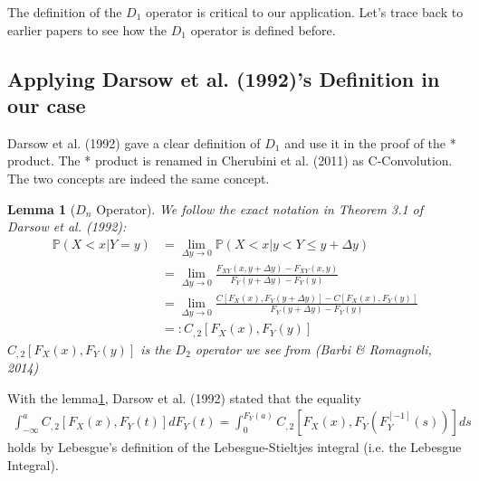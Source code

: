 \documentclass[11pt, leqno]{article}
\newtheorem{lemma}{Lemma}[section]
\numberwithin{equation}{section}
\begin{document}
    The definition of the $D_1$ operator is critical to our application.
Let's trace back to earlier papers to see how the $D_1$ operator is defined before.\newline

\subsection{Applying Darsow et al. (1992)'s Definition in our case}\label{sec:Darsow}

Darsow et al. (1992) gave a clear definition of $D_1$ and use it in the proof of the * product.
The * product is renamed in Cherubini et al. (2011) as C-Convolution.
The two concepts are indeed the same concept.
\begin{lemma}[$D_n$ Operator]\label{lem:Dn} We follow the exact notation in Theorem 3.1 of Darsow et al. (1992):
    \begin{align}
        \mathbb{P}(X<x|Y=y) &= \lim_{\Delta y \rightarrow 0} \mathbb{P}(X<x|y<Y\leq y+ \Delta y)\\
        &= \lim_{\Delta y \rightarrow 0} \frac{F_{XY}(x,y+\Delta y) - F_{XY}(x,y)}{F_Y(y+\Delta y)-F_Y(y)}\\
        &= \lim_{\Delta y \rightarrow 0} \frac{C[F_X(x), F_Y(y+\Delta y)] - C[F_X(x), F_Y(y)]}{F_Y(y+\Delta y)-F_Y(y)}  \label{eq:limD2}\\
        &=: C_{,2}[F_X(x), F_Y(y)]
    \end{align}
$C_{,2}[F_X(x), F_Y(y)]$ is the $D_2$ operator we see from (Barbi \& Romagnoli, 2014)\newline
\end{lemma}

    With the lemma\ref{lem:Dn}, Darsow et al. (1992) stated that the equality
\begin{align} \label{eq:leb}
    \int^a_{-\infty}C_{,2}[F_X(x), F_Y(t)]dF_Y(t) = \int^{F_Y(a)}_0 C_{,2}[F_X(x), F_Y(F_Y^{[-1]}(s))]ds
\end{align}
holds by Lebesgue's definition of the Lebesgue-Stieltjes integral (i.e. the Lebesgue Integral).\newline
\end{document}
